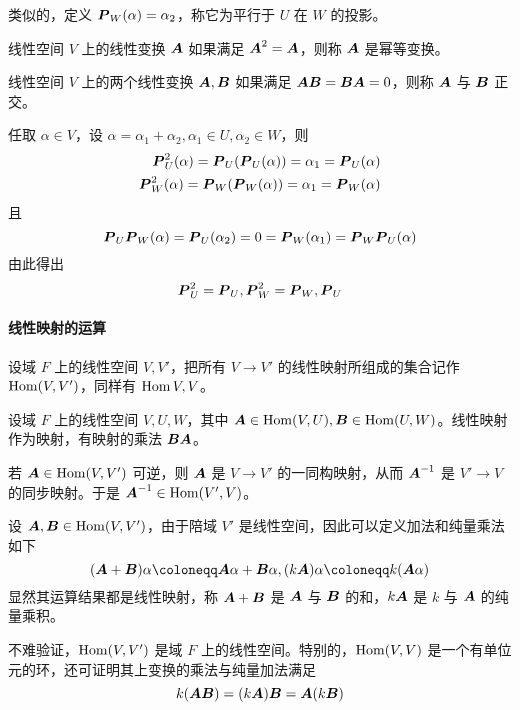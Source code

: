 类似的，定义 $\boldsymbol{P}_W(\alpha) = \alpha_2$，称它为平行于 $U$ 在 $W$ 的投影。

\begin{definition}[幂等变换]
	线性空间 $V$ 上的线性变换 $\boldsymbol{A}$ 如果满足 $\boldsymbol{A}^2 = \boldsymbol{A}$，则称 $\boldsymbol{A}$ 是幂等变换。
\end{definition}

\begin{definition}
	线性空间 $V$ 上的两个线性变换 $\boldsymbol{A}, \boldsymbol{B}$ 如果满足 $\boldsymbol{A}\boldsymbol{B} = \boldsymbol{B}\boldsymbol{A} = 0$，则称 $\boldsymbol{A}$ 与 $\boldsymbol{B}$ 正交。
\end{definition}

任取 $\alpha\in V$，设 $\alpha = \alpha_1 + \alpha_2, \alpha_1 \in U, \alpha_2 \in W$，则
\begin{equation*}
	\begin{aligned}
		\boldsymbol{P}_U^2(\alpha) = \boldsymbol{P}_U(\boldsymbol{P}_U(\alpha)) = \alpha_1 = \boldsymbol{P}_U(\alpha) \\
		\boldsymbol{P}_W^2(\alpha) = \boldsymbol{P}_W(\boldsymbol{P}_W(\alpha)) = \alpha_1 = \boldsymbol{P}_W(\alpha)
	\end{aligned}
\end{equation*}
且
\[ \boldsymbol{P}_U\boldsymbol{P}_W(\alpha) = \boldsymbol{P}_U(\alpha_2) = 0 = \boldsymbol{P}_W(\alpha_1) = \boldsymbol{P}_W\boldsymbol{P}_U(\alpha) \]
由此得出
\[ \boldsymbol{P}_U^2 = \boldsymbol{P}_U, \boldsymbol{P}_W^2 = \boldsymbol{P}_W, \boldsymbol{P}_U \]

\paragraph{线性映射的运算}

设域 $F$ 上的线性空间 $V,V'$，把所有 $V \to V'$ 的线性映射所组成的集合记作 $\operatorname{Hom}(V,V')$，同样有 $\operatorname{Hom}{V,V}$。

设域 $F$ 上的线性空间 $V,U,W$，其中 $\boldsymbol{A} \in \operatorname{Hom}(V,U), \boldsymbol{B} \in \operatorname{Hom}(U,W)$。线性映射作为映射，有映射的乘法 $\boldsymbol{B}\boldsymbol{A}$。

若 $\boldsymbol{A}\in \operatorname{Hom}(V,V')$ 可逆，则 $\boldsymbol{A}$ 是 $V \to V'$ 的一同构映射，从而 $\boldsymbol{A}^{-1}$ 是 $V' \to V$ 的同步映射。于是 $\boldsymbol{A}^{-1} \in \operatorname{Hom}(V',V)$。

设 $\boldsymbol{A},\boldsymbol{B} \in \operatorname{Hom} (V,V')$，由于陪域 $V'$ 是线性空间，因此可以定义加法和纯量乘法如下
\[ (\vbf{A} + \vbf{B}) \alpha \coloneqq \vbf{A}\alpha + \vbf{B}\alpha, (k\vbf{A})\alpha \coloneqq k(\vbf{A} \alpha) \]
显然其运算结果都是线性映射，称 $\boldsymbol{A} + \boldsymbol{B}$ 是 $\boldsymbol{A}$ 与 $\boldsymbol{B}$ 的和，$k\boldsymbol{A}$ 是 $k$ 与 $\boldsymbol{A}$ 的纯量乘积。

不难验证，$\operatorname{Hom}(V,V')$ 是域 $F$ 上的线性空间。特别的，$\operatorname{Hom}(V,V)$ 是一个有单位元的环，还可证明其上变换的乘法与纯量加法满足
\[ k(\boldsymbol{A}\boldsymbol{B}) = (k\boldsymbol{A})\boldsymbol{B} = \boldsymbol{A}(k\boldsymbol{B}) \]


